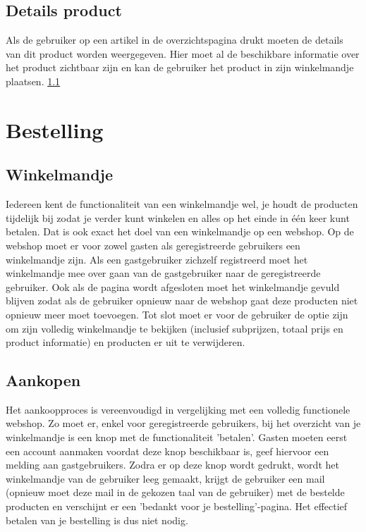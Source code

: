 \documentclass{article}
\begin{document}
\subsection{Details product}
\label{subsection:detail_product}
Als de gebruiker op een artikel in de overzichtspagina drukt moeten de details van dit product worden weergegeven. Hier moet al de beschikbare informatie over het product zichtbaar zijn en kan de gebruiker het product in zijn winkelmandje plaatsen. \ref{subsection:winkelmandje}

\section{Bestelling}
\subsection{Winkelmandje}
\label{subsection:winkelmandje}
Iedereen kent de functionaliteit van een winkelmandje wel, je houdt de producten tijdelijk bij zodat je verder kunt winkelen en alles op het einde in één keer kunt betalen. Dat is ook exact het doel van een winkelmandje op een webshop. Op de webshop moet er voor zowel gasten als geregistreerde gebruikers een winkelmandje zijn. Als een gastgebruiker zichzelf registreerd moet het winkelmandje mee over gaan van de gastgebruiker naar de geregistreerde gebruiker. Ook als de pagina wordt afgesloten moet het winkelmandje gevuld blijven zodat als de gebruiker opnieuw naar de webshop gaat deze producten niet opnieuw meer moet toevoegen. Tot slot moet er voor de gebruiker de optie zijn om zijn volledig winkelmandje te bekijken (inclusief subprijzen, totaal prijs en product informatie) en producten er uit te verwijderen. 

\subsection{Aankopen}
Het aankoopproces is vereenvoudigd in vergelijking met een volledig functionele webshop. Zo moet er, enkel voor geregistreerde gebruikers, bij het overzicht van je winkelmandje is een knop met de functionaliteit 'betalen'. Gasten moeten eerst een account aanmaken voordat deze knop beschikbaar is, geef hiervoor een melding aan gastgebruikers. Zodra er op deze knop wordt gedrukt, wordt het winkelmandje van de gebruiker leeg gemaakt, krijgt de gebruiker een mail (opnieuw moet deze mail in de gekozen taal van de gebruiker) met de bestelde producten en verschijnt er een 'bedankt voor je bestelling'-pagina. Het effectief betalen van je bestelling is dus niet nodig.
\end{document}
